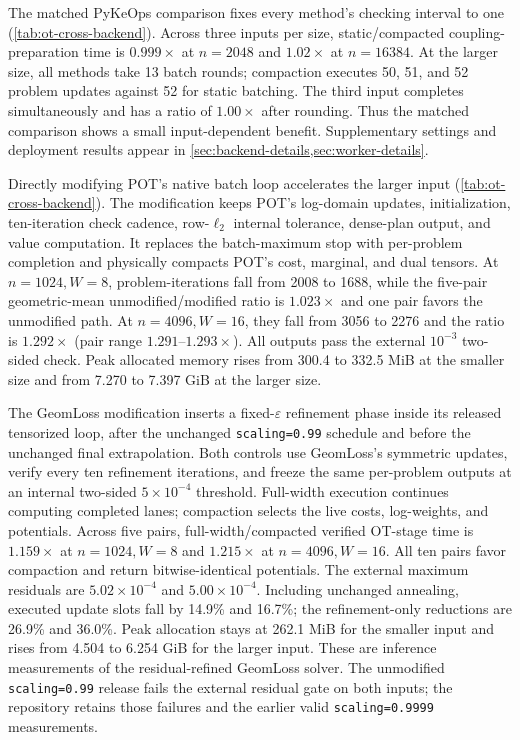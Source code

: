 The matched PyKeOps comparison fixes every method's checking interval to one (\cref{tab:ot-cross-backend}). Across three inputs per size, static/compacted coupling-preparation time is $0.999\times$ at $n=2048$ and $1.02\times$ at $n=16384$. At the larger size, all methods take 13 batch rounds; compaction executes 50, 51, and 52 problem updates against 52 for static batching. The third input completes simultaneously and has a ratio of $1.00\times$ after rounding. Thus the matched comparison shows a small input-dependent benefit. Supplementary settings and deployment results appear in \cref{sec:backend-details,sec:worker-details}.

Directly modifying POT's native batch loop accelerates the larger input (\cref{tab:ot-cross-backend}). The modification keeps POT's log-domain updates, initialization, ten-iteration check cadence, row-$\ell_2$ internal tolerance, dense-plan output, and value computation. It replaces the batch-maximum stop with per-problem completion and physically compacts POT's cost, marginal, and dual tensors. At $n=1024,W=8$, problem-iterations fall from 2008 to 1688, while the five-pair geometric-mean unmodified/modified ratio is $1.023\times$ and one pair favors the unmodified path. At $n=4096,W=16$, they fall from 3056 to 2276 and the ratio is $1.292\times$ (pair range $1.291$--$1.293\times$). All outputs pass the external $10^{-3}$ two-sided check. Peak allocated memory rises from 300.4 to 332.5 MiB at the smaller size and from 7.270 to 7.397 GiB at the larger size.

The GeomLoss modification inserts a fixed-$\varepsilon$ refinement phase inside its released tensorized loop, after the unchanged \texttt{scaling=0.99} schedule and before the unchanged final extrapolation. Both controls use GeomLoss's symmetric updates, verify every ten refinement iterations, and freeze the same per-problem outputs at an internal two-sided $5\times10^{-4}$ threshold. Full-width execution continues computing completed lanes; compaction selects the live costs, log-weights, and potentials. Across five pairs, full-width/compacted verified OT-stage time is $1.159\times$ at $n=1024,W=8$ and $1.215\times$ at $n=4096,W=16$. All ten pairs favor compaction and return bitwise-identical potentials. The external maximum residuals are $5.02\times10^{-4}$ and $5.00\times10^{-4}$. Including unchanged annealing, executed update slots fall by 14.9\% and 16.7\%; the refinement-only reductions are 26.9\% and 36.0\%. Peak allocation stays at 262.1 MiB for the smaller input and rises from 4.504 to 6.254 GiB for the larger input. These are inference measurements of the residual-refined GeomLoss solver. The unmodified \texttt{scaling=0.99} release fails the external residual gate on both inputs; the repository retains those failures and the earlier valid \texttt{scaling=0.9999} measurements.

